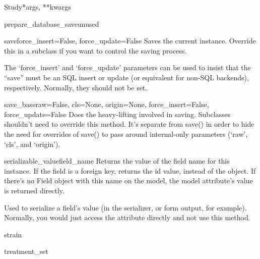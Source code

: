 \documentclass[letterpaper,10pt,english]{sphinxmanual}
\begin{document}
\begin{classdesc}{Study}{*args, **kwargs}
\hypertarget{data.models.Study.prepare_database_save}{}\begin{methoddesc}[Study]{prepare\_database\_save}{unused}\end{methoddesc}

\hypertarget{data.models.Study.save}{}\begin{methoddesc}[Study]{save}{force\_insert=False, force\_update=False}
Saves the current instance. Override this in a subclass if you want to
control the saving process.

The `force\_insert' and `force\_update' parameters can be used to insist
that the ``save'' must be an SQL insert or update (or equivalent for
non-SQL backends), respectively. Normally, they should not be set.
\end{methoddesc}

\hypertarget{data.models.Study.save_base}{}\begin{methoddesc}[Study]{save\_base}{raw=False, cls=None, origin=None, force\_insert=False, force\_update=False}
Does the heavy-lifting involved in saving. Subclasses shouldn't need to
override this method. It's separate from save() in order to hide the
need for overrides of save() to pass around internal-only parameters
(`raw', `cls', and `origin').
\end{methoddesc}

\hypertarget{data.models.Study.serializable_value}{}\begin{methoddesc}[Study]{serializable\_value}{field\_name}
Returns the value of the field name for this instance. If the field is
a foreign key, returns the id value, instead of the object. If there's
no Field object with this name on the model, the model attribute's
value is returned directly.

Used to serialize a field's value (in the serializer, or form output,
for example). Normally, you would just access the attribute directly
and not use this method.
\end{methoddesc}

\hypertarget{data.models.Study.strain}{}\begin{memberdesc}[Study]{strain}\end{memberdesc}

\hypertarget{data.models.Study.treatment_set}{}\begin{memberdesc}[Study]{treatment\_set}\end{memberdesc}
\end{classdesc}
\end{document}
